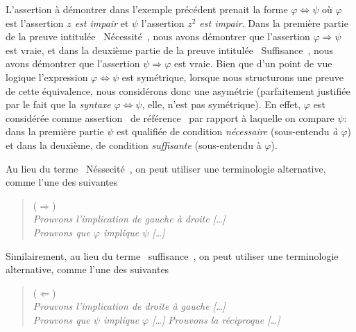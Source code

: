 \documentclass[french,course,oneside,theoremnosection]{lecture}
\newcommand{\iimplies}{\Rightarrow}
\newcommand{\ifff}{\Leftrightarrow}
\begin{document}
\begin{remark}
L'assertion à démontrer dans l'exemple précédent prenait la forme $\varphi \ifff \psi$ où $\varphi$ est l'assertion \emph{$z$ est impair} et $\psi$ l'assertion \emph{$z^2$ est impair}. Dans la première partie de la preuve intitulée \og~Nécessité~\fg{}, nous avons démontrer que l'assertion $\varphi \iimplies \psi$ est vraie, et dans la deuxième partie de la preuve intitulée \og~Suffisance~\fg, nous avons démontrer que l'assertion $\psi  \iimplies \varphi$ est vraie. Bien que d'un point de vue logique l'expression $\varphi \ifff \psi$ est symétrique, lorsque nous structurons une preuve de cette équivalence, nous considérons donc une asymétrie (parfaitement justifiée par le fait que la \emph{syntaxe} $\varphi \ifff \psi$, elle, n'est pas symétrique). En effet, $\varphi$ est considérée comme assertion \og~de référence~\fg{} par rapport à laquelle on compare $\psi$: dans la première partie $\psi$ est qualifiée de condition \emph{nécessaire} (sous-entendu \emph{à $\varphi$}) et dans la deuxième, de condition \emph{suffisante} (sous-entendu à $\varphi$).

Au lieu du terme \og~Néssecité~\fg{}, on peut utiliser une terminologie alternative, comme l'une des suivantes 
\begin{quotation}
\noindent (${\Longrightarrow}$)\\
\emph{Prouvons l'implication de gauche à droite [\ldots]}\\
\emph{Prouvons que $\varphi$ implique $\psi$ [\ldots]}	
\end{quotation}
Similairement, au lieu du terme \og~suffisance~\fg{}, on peut utiliser une terminologie alternative, comme l'une des suivantes 
\begin{quotation}
\noindent (${\Longleftarrow}$)\\
\emph{Prouvons l'implication de droite à gauche [\ldots]}\\
\emph{Prouvons que $\psi$ implique $\varphi$ [\ldots]}	
\emph{Prouvons la réciproque [\ldots]}
\end{quotation}
\end{remark}
\end{document}
